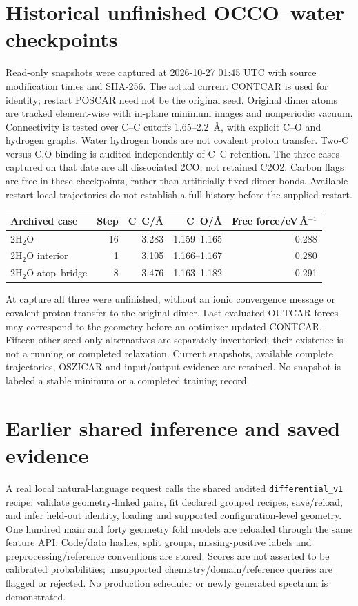 \documentclass[11pt,a4paper]{article}
\begin{document}
\clearpage
\section{Historical unfinished OCCO--water checkpoints}
Read-only snapshots were captured at 2026-10-27 01:45 UTC with source modification times and SHA-256. The actual current CONTCAR is used for identity; restart POSCAR need not be the original seed. Original dimer atoms are tracked element-wise with in-plane minimum images and nonperiodic vacuum. Connectivity is tested over C--C cutoffs 1.65--2.2~\AA, with explicit C--O and hydrogen graphs. Water hydrogen bonds are not covalent proton transfer. Two-C versus C,O binding is audited independently of C--C retention. The three cases captured on that date are all dissociated 2CO, not retained C2O2. Carbon flags are free in these checkpoints, rather than artificially fixed dimer bonds. Available restart-local trajectories do not establish a full history before the supplied restart.

\begin{center}\begin{tabular}{lrrrr}\toprule
Archived case & Step & C--C/\AA & C--O/\AA & Free force/eV\,\AA$^{-1}$\\\midrule
2H$_2$O &16&3.283&1.159--1.165&0.288\\
2H$_2$O interior &1&3.105&1.166--1.167&0.280\\
2H$_2$O atop--bridge &8&3.476&1.163--1.182&0.291\\\bottomrule\end{tabular}\end{center}
At capture all three were unfinished, without an ionic convergence message or covalent proton transfer to the original dimer. Last evaluated OUTCAR forces may correspond to the geometry before an optimizer-updated CONTCAR. Fifteen other seed-only alternatives are separately inventoried; their existence is not a running or completed relaxation. Current snapshots, available complete trajectories, OSZICAR and input/output evidence are retained. No snapshot is labeled a stable minimum or a completed training record.

\section{Earlier shared inference and saved evidence}
A real local natural-language request calls the shared audited \texttt{differential\_v1} recipe: validate geometry-linked pairs, fit declared grouped recipes, save/reload, and infer held-out identity, loading and supported configuration-level geometry. One hundred main and forty geometry fold models are reloaded through the same feature API. Code/data hashes, split groups, missing-positive labels and preprocessing/reference conventions are stored. Scores are not asserted to be calibrated probabilities; unsupported chemistry/domain/reference queries are flagged or rejected. No production scheduler or newly generated spectrum is demonstrated.
\end{document}
